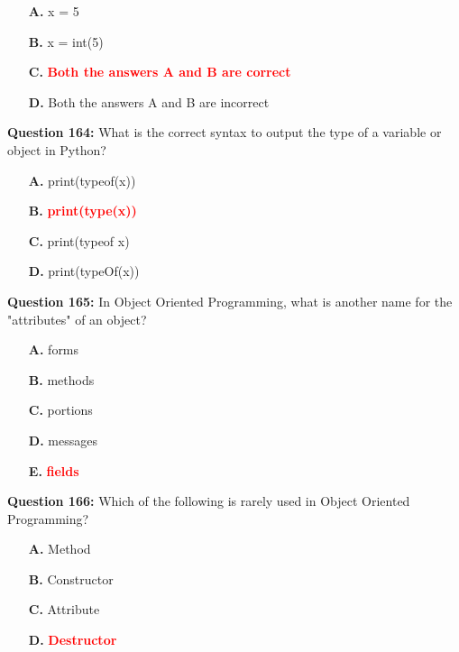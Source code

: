 \documentclass[12pt,a4paper]{article}
\begin{document}
\begin{itemize}
    \item[\textbf{A.}] x = 5
    \item[\textbf{B.}] x = int(5)
    \item[\textbf{C.}] \textcolor{red}{\textbf{Both the answers A and B are correct}}
    \item[\textbf{D.}] Both the answers A and B are incorrect
\end{itemize}

\vspace{0.5cm}

\textbf{Question 164:} What is the correct syntax to output the type of a variable or object in Python?

\begin{itemize}
    \item[\textbf{A.}] print(typeof(x))
    \item[\textbf{B.}] \textcolor{red}{\textbf{print(type(x))}}
    \item[\textbf{C.}] print(typeof x)
    \item[\textbf{D.}] print(typeOf(x))
\end{itemize}

\vspace{0.5cm}

\textbf{Question 165:} In Object Oriented Programming, what is another name for the "attributes" of an object?

\begin{itemize}
    \item[\textbf{A.}] forms
    \item[\textbf{B.}] methods
    \item[\textbf{C.}] portions
    \item[\textbf{D.}] messages
    \item[\textbf{E.}] \textcolor{red}{\textbf{fields}}
\end{itemize}

\vspace{0.5cm}

\textbf{Question 166:} Which of the following is rarely used in Object Oriented Programming?

\begin{itemize}
    \item[\textbf{A.}] Method
    \item[\textbf{B.}] Constructor
    \item[\textbf{C.}] Attribute
    \item[\textbf{D.}] \textcolor{red}{\textbf{Destructor}}
\end{itemize}
\end{document}
